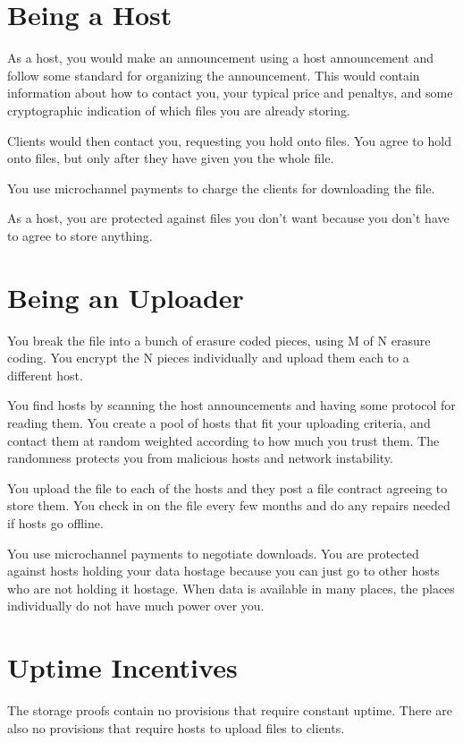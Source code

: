 \documentclass[twocolumn]{article}
\begin{document}
\section{Being a Host}
As a host, you would make an announcement using a host announcement and follow some standard for organizing the announcement.
This would contain information about how to contact you, your typical price and penaltys, and some cryptographic indication of which files you are already storing.

Clients would then contact you, requesting you hold onto files.
You agree to hold onto files, but only after they have given you the whole file.

You use microchannel payments to charge the clients for downloading the file.

As a host, you are protected against files you don't want because you don't have to agree to store anything.

\section{Being an Uploader}
You break the file into a bunch of erasure coded pieces, using M of N erasure coding.
You encrypt the N pieces individually and upload them each to a different host.

You find hosts by scanning the host announcements and having some protocol for reading them.
You create a pool of hosts that fit your uploading criteria, and contact them at random weighted according to how much you trust them.
The randomness protects you from malicious hosts and network instability.

You upload the file to each of the hosts and they post a file contract agreeing to store them.
You check in on the file every few months and do any repairs needed if hosts go offline.

You use microchannel payments to negotiate downloads.
You are protected against hosts holding your data hostage because you can just go to other hosts who are not holding it hostage.
When data is available in many places, the places individually do not have much power over you.

\section{Uptime Incentives}
The storage proofs contain no provisions that require constant uptime.
There are also no provisions that require hosts to upload files to clients.
\end{document}
